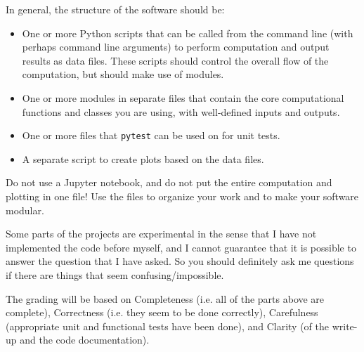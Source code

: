 \documentclass[11pt, preprint]{aastex}
\begin{document}
In general, the structure of the software should be:
\begin{itemize}
  \item One or more Python scripts that can be called from the command
    line (with perhaps command line arguments) to perform computation
    and output results as data files. These scripts should control the
    overall flow of the computation, but should make use of modules.
  \item One or more modules in separate files that contain the core
    computational functions and classes you are using, with
    well-defined inputs and outputs.
  \item One or more files that {\tt pytest} can be used on for unit
    tests.
  \item A separate script to create plots based on the data files.
\end{itemize}
Do not use a Jupyter notebook, and do not put the entire computation
and plotting in one file! Use the files to organize your work and to
make your software modular.

Some parts of the projects are experimental in the sense that I have
not implemented the code before myself, and I cannot guarantee that it
is possible to answer the question that I have asked. So you should
definitely ask me questions if there are things that seem
confusing/impossible.

The grading will be based on Completeness (i.e. all of the parts above
are complete), Correctness (i.e. they seem to be done correctly),
Carefulness (appropriate unit and functional tests have been done),
and Clarity (of the write-up and the code documentation).
\end{document}
